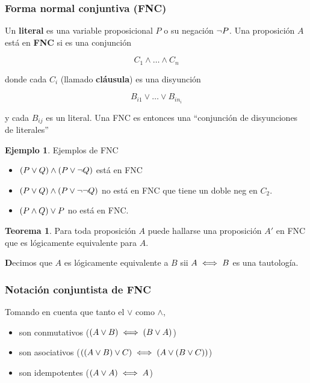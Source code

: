 \documentclass{report}
\theoremstyle{definition} %
\newtheorem{theorem}{Teorema}[chapter]
\newtheorem*{example*}{Ejemplo}
\newenvironment{nota}[1]
    {\begin{leftbar}\textbf{#1}}
    {\end{leftbar}}
\begin{document}
\subsubsection{Forma normal conjuntiva (FNC)}\label{sec:logico-prop-fnc}

Un \textbf{literal} es una variable proposicional $P$ o su negación $\neg P$.
Una proposición $A$ está en \textbf{FNC} si es una conjunción

\[
    C_1 \wedge \dots \wedge C_n
\]

donde cada $C_i$ (llamado \textbf{cláusula}) es una disyunción

\[
    B_{i1} \vee \dots \vee B_{in_i}
\]

y cada $B_{ij}$ es un literal. Una FNC es entonces una ``conjunción de
disyunciones de literales''

\begin{example*}Ejemplos de FNC
    \begin{itemize}
        \item $(P \vee Q) \wedge (P \vee \neg Q)$ está en FNC
        \item $(P \vee Q) \wedge (P \vee \neg \neg Q)$ no está en FNC que
        tiene un doble neg en $C_2$.
        \item $(P \wedge Q) \vee P$ no está en FNC.
    \end{itemize}
\end{example*}

\begin{theorem}
    Para toda proposición $A$ puede hallarse una proposición $A'$ en FNC que es
    lógicamente equivalente para $A$.
\end{theorem}

\begin{nota}
    Decimos que $A$ es lógicamente equivalente a $B$ sii $A \iff B$ es una
    tautología.
\end{nota}

\subsubsection{Notación conjuntista de FNC}

Tomando en cuenta que tanto el $\vee$ como $\wedge$,

\begin{itemize}
    \item son conmutativos ($(A \vee B) \iff (B \vee A)$)
    \item son asociativos
    ($((A \vee B) \vee C) \iff (A \vee (B \vee C))$)
    \item son idempotentes ($(A \vee A) \iff A$)
\end{itemize}
\end{document}
